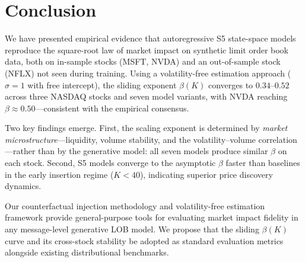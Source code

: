 \documentclass[sigplan,screen,anonymous]{acmart}
\begin{document}
\section{Conclusion}
\label{sec:conclusion}

We have presented empirical evidence that autoregressive S5 state-space models reproduce the square-root law of market impact on synthetic limit order book data, both on in-sample stocks (MSFT, NVDA) and an out-of-sample stock (NFLX) not seen during training. Using a volatility-free estimation approach ($\sigma = 1$ with free intercept), the sliding exponent $\beta(K)$ converges to $0.34$--$0.52$ across three NASDAQ stocks and seven model variants, with NVDA reaching $\beta \approx 0.50$---consistent with the empirical consensus.

Two key findings emerge. First, the scaling exponent is determined by \emph{market microstructure}---liquidity, volume stability, and the volatility--volume correlation---rather than by the generative model: all seven models produce similar $\beta$ on each stock. Second, S5 models converge to the asymptotic $\beta$ faster than baselines in the early insertion regime ($K < 40$), indicating superior price discovery dynamics.

Our counterfactual injection methodology and volatility-free estimation framework provide general-purpose tools for evaluating market impact fidelity in any message-level generative LOB model. We propose that the sliding $\beta(K)$ curve and its cross-stock stability be adopted as standard evaluation metrics alongside existing distributional benchmarks.




\end{document}
